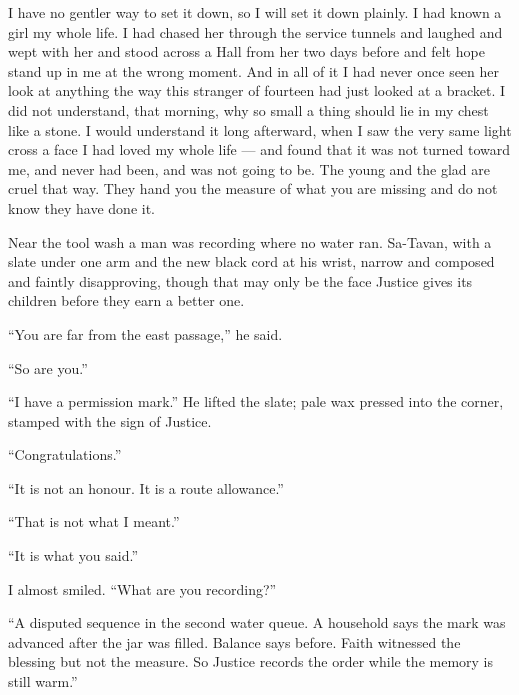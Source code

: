 I have no gentler way to set it down, so I will set it down plainly. I had known a girl my whole life. I had chased her through the service tunnels and laughed and wept with her and stood across a Hall from her two days before and felt hope stand up in me at the wrong moment. And in all of it I had never once seen her look at anything the way this stranger of fourteen had just looked at a bracket. I did not understand, that morning, why so small a thing should lie in my chest like a stone. I would understand it long afterward, when I saw the very same light cross a face I had loved my whole life --- and found that it was not turned toward me, and never had been, and was not going to be. The young and the glad are cruel that way. They hand you the measure of what you are missing and do not know they have done it.\par

\ornament

\noindent Near the tool wash a man was recording where no water ran. Sa-Tavan, with a slate under one arm and the new black cord at his wrist, narrow and composed and faintly disapproving, though that may only be the face Justice gives its children before they earn a better one.\par

``You are far from the east passage,'' he said.\par

``So are you.''\par

``I have a permission mark.'' He lifted the slate; pale wax pressed into the corner, stamped with the sign of Justice.\par

``Congratulations.''\par

``It is not an honour. It is a route allowance.''\par

``That is not what I meant.''\par

``It is what you said.''\par

I almost smiled. ``What are you recording?''\par

``A disputed sequence in the second water queue. A household says the mark was advanced after the jar was filled. Balance says before. Faith witnessed the blessing but not the measure. So Justice records the order while the memory is still warm.''\par

